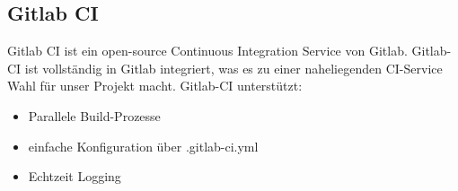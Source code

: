\subsection{Gitlab CI}
Gitlab CI ist ein open-source Continuous Integration Service von Gitlab. Gitlab-CI ist vollständig in Gitlab integriert, was es zu einer naheliegenden CI-Service Wahl für unser Projekt macht.
Gitlab-CI unterstützt:
\begin{itemize}
	\item Parallele Build-Prozesse
	\item einfache Konfiguration über .gitlab-ci.yml
	\item Echtzeit Logging
\end{itemize}
\cite{gitlabciwiki}